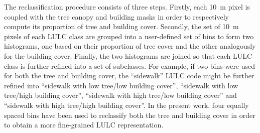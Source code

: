\documentclass[10pt,letterpaper]{article}
\begin{document}
The reclassification procedure consists of three steps.
Firstly, each 10~m pixel is coupled with the tree canopy and building masks in order to respectively compute its proportion of tree and building cover.
Secondly, the set of 10~m pixels of each LULC class are grouped into a user-defined set of bins to form two histograms, one based on their proportion of tree cover and the other analogously for the building cover.
Finally, the two histograms are joined so that each LULC class is further refined into a set of subclasses. For example, if two bins were used for both the tree and building cover, the ``sidewalk'' LULC code might be further refined into ``sidewalk with low tree/low building cover'', ``sidewalk with low tree/high building cover'', ``sidewalk with high tree/low building cover'' and ``sidewalk with high tree/high building cover''.
In the present work, four equally spaced bins have been used to reclassify both the tree and building cover in order to obtain a more fine-grained LULC representation.
\end{document}
